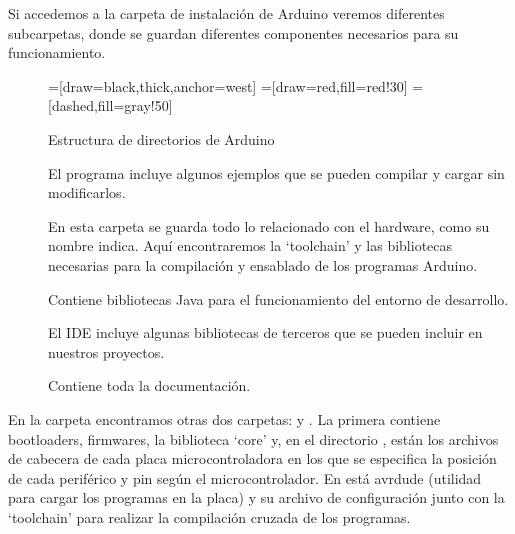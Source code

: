Si accedemos a la carpeta de instalación de Arduino veremos diferentes subcarpetas, donde se guardan diferentes componentes necesarios para su funcionamiento.
\begin{figure}[H]
\begin{center}
=[draw=black,thick,anchor=west]
=[draw=red,fill=red!30]
=[dashed,fill=gray!50]
\end{center}
\caption{Estructura de directorios de Arduino}
\label{arduino_carpetas}
\end{figure}

\begin{description}
	\item[] El programa incluye algunos ejemplos que se pueden compilar y cargar sin modificarlos. 
	\item[] En esta carpeta se guarda todo lo relacionado con el hardware, como su nombre indica. Aquí encontraremos la `toolchain' y las bibliotecas necesarias para la compilación y ensablado de los programas Arduino.
	\item[] Contiene bibliotecas Java para el funcionamiento del entorno de desarrollo.
		\item[] El IDE incluye algunas bibliotecas de terceros que se pueden incluir en nuestros proyectos.
		\item[] Contiene toda la documentación.
\end{description}

En la carpeta  encontramos otras dos carpetas:  y .  La primera contiene bootloaders, firmwares, la biblioteca `core' y, en el directorio , están los archivos de cabecera de cada placa microcontroladora en los que se especifica la posición de cada periférico y pin según el microcontrolador.  En  está avrdude (utilidad para cargar los programas en la placa) y su archivo de configuración junto con la `toolchain'  para realizar la compilación cruzada de los programas.

